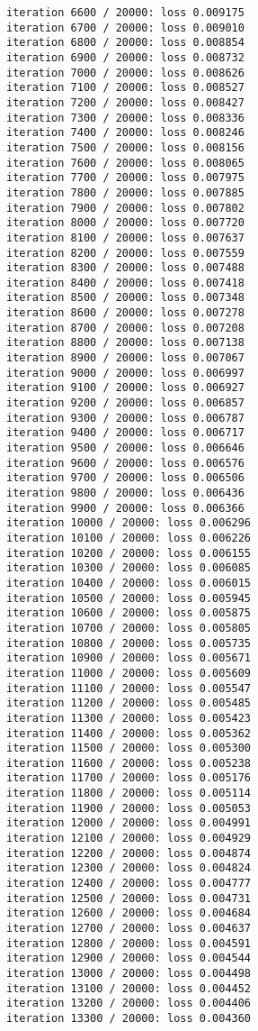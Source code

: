 \documentclass[11pt]{article}
\begin{document}
\begin{Verbatim}[commandchars=\\\{\}]
iteration 6600 / 20000: loss 0.009175
iteration 6700 / 20000: loss 0.009010
iteration 6800 / 20000: loss 0.008854
iteration 6900 / 20000: loss 0.008732
iteration 7000 / 20000: loss 0.008626
iteration 7100 / 20000: loss 0.008527
iteration 7200 / 20000: loss 0.008427
iteration 7300 / 20000: loss 0.008336
iteration 7400 / 20000: loss 0.008246
iteration 7500 / 20000: loss 0.008156
iteration 7600 / 20000: loss 0.008065
iteration 7700 / 20000: loss 0.007975
iteration 7800 / 20000: loss 0.007885
iteration 7900 / 20000: loss 0.007802
iteration 8000 / 20000: loss 0.007720
iteration 8100 / 20000: loss 0.007637
iteration 8200 / 20000: loss 0.007559
iteration 8300 / 20000: loss 0.007488
iteration 8400 / 20000: loss 0.007418
iteration 8500 / 20000: loss 0.007348
iteration 8600 / 20000: loss 0.007278
iteration 8700 / 20000: loss 0.007208
iteration 8800 / 20000: loss 0.007138
iteration 8900 / 20000: loss 0.007067
iteration 9000 / 20000: loss 0.006997
iteration 9100 / 20000: loss 0.006927
iteration 9200 / 20000: loss 0.006857
iteration 9300 / 20000: loss 0.006787
iteration 9400 / 20000: loss 0.006717
iteration 9500 / 20000: loss 0.006646
iteration 9600 / 20000: loss 0.006576
iteration 9700 / 20000: loss 0.006506
iteration 9800 / 20000: loss 0.006436
iteration 9900 / 20000: loss 0.006366
iteration 10000 / 20000: loss 0.006296
iteration 10100 / 20000: loss 0.006226
iteration 10200 / 20000: loss 0.006155
iteration 10300 / 20000: loss 0.006085
iteration 10400 / 20000: loss 0.006015
iteration 10500 / 20000: loss 0.005945
iteration 10600 / 20000: loss 0.005875
iteration 10700 / 20000: loss 0.005805
iteration 10800 / 20000: loss 0.005735
iteration 10900 / 20000: loss 0.005671
iteration 11000 / 20000: loss 0.005609
iteration 11100 / 20000: loss 0.005547
iteration 11200 / 20000: loss 0.005485
iteration 11300 / 20000: loss 0.005423
iteration 11400 / 20000: loss 0.005362
iteration 11500 / 20000: loss 0.005300
iteration 11600 / 20000: loss 0.005238
iteration 11700 / 20000: loss 0.005176
iteration 11800 / 20000: loss 0.005114
iteration 11900 / 20000: loss 0.005053
iteration 12000 / 20000: loss 0.004991
iteration 12100 / 20000: loss 0.004929
iteration 12200 / 20000: loss 0.004874
iteration 12300 / 20000: loss 0.004824
iteration 12400 / 20000: loss 0.004777
iteration 12500 / 20000: loss 0.004731
iteration 12600 / 20000: loss 0.004684
iteration 12700 / 20000: loss 0.004637
iteration 12800 / 20000: loss 0.004591
iteration 12900 / 20000: loss 0.004544
iteration 13000 / 20000: loss 0.004498
iteration 13100 / 20000: loss 0.004452
iteration 13200 / 20000: loss 0.004406
iteration 13300 / 20000: loss 0.004360

\end{Verbatim}
\end{document}
